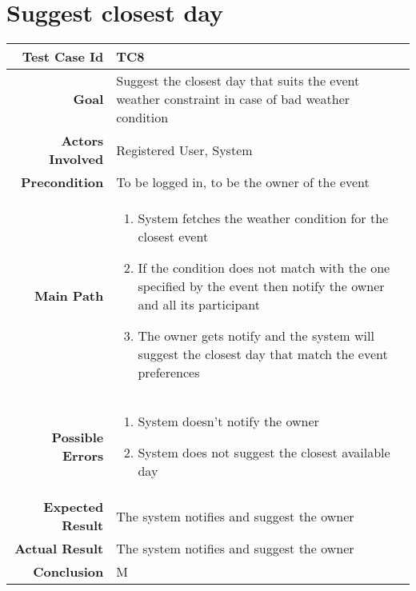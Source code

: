 \section{Suggest closest day}
\begin{tabularx}{\linewidth}{|r|X|X|}
\hline   {\bf Test Case Id} &  TC8\\
  \hline  {\bf Goal} & Suggest the closest day that suits the event weather constraint in case of bad weather condition\\
  \hline  {\bf Actors Involved} & Registered User, System\\
  \hline  {\bf Precondition} & To be logged in, to be the owner of the event\\ 
   \hline  {\bf Main Path} & \begin{enumerate} 
   \item System fetches the weather condition for the closest event
    \item If the condition does not match with the one specified by the event then notify the owner and all its participant
    \item The owner gets notify and the system will suggest the closest day that match the event preferences
   \end{enumerate}\\
   \hline  {\bf Possible Errors} & \begin{enumerate} 
   \item System doesn't notify the owner
   \item System does not suggest the closest available day
   \end{enumerate}\\
  \hline  {\bf Expected Result} & The system notifies and suggest the owner\\
  \hline  {\bf Actual Result} & The system notifies and suggest the owner\\
  \hline  {\bf Conclusion} & M\\
  \hline
  
\end{tabularx}





